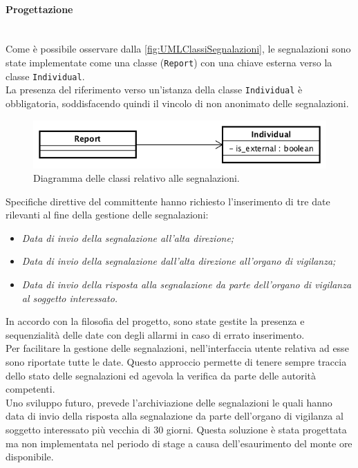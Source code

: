 	\paragraph*{Progettazione}\mbox{} \\
	Come è possibile osservare dalla \autoref{fig:UMLClassiSegnalazioni}, le segnalazioni sono state implementate come una classe (\texttt{Report}) con una chiave esterna verso la classe \texttt{Individual}. \\
	La presenza del riferimento verso un'istanza della classe \texttt{Individual} è obbligatoria, soddisfacendo quindi il vincolo di non anonimato delle segnalazioni.\\
	\begin{figure}[H]
		\begin{center}
			\includegraphics[width=12cm]{Pics/UMLClassiSegnalazioni.png}
			\caption{Diagramma delle classi relativo alle segnalazioni.}
			\label{fig:UMLClassiSegnalazioni}
		\end{center}
	\end{figure}
	Specifiche direttive del committente hanno richiesto l'inserimento di tre date rilevanti al fine della gestione delle segnalazioni:
	\begin{itemize}
		\item \textit{Data di invio della segnalazione all'alta direzione;}
		\item \textit{Data di invio della segnalazione dall'alta direzione all'organo di vigilanza;}
		\item \textit{Data di invio della risposta alla segnalazione da parte dell'organo di vigilanza al soggetto interessato.}
	\end{itemize}
	In accordo con la filosofia del progetto, sono state gestite la presenza e sequenzialità delle date con degli allarmi in caso di errato inserimento.\\
	Per facilitare la gestione delle segnalazioni, nell'interfaccia utente relativa ad esse sono riportate tutte le date. Questo approccio permette di tenere sempre traccia dello stato delle segnalazioni ed agevola la verifica da parte delle autorità competenti.\\
	Uno sviluppo futuro, prevede l'archiviazione delle segnalazioni le quali hanno data di invio della risposta alla segnalazione da parte dell'organo di vigilanza al soggetto interessato più vecchia di 30 giorni. Questa soluzione è stata progettata ma non implementata nel periodo di stage a causa dell'esaurimento del monte ore disponibile.
